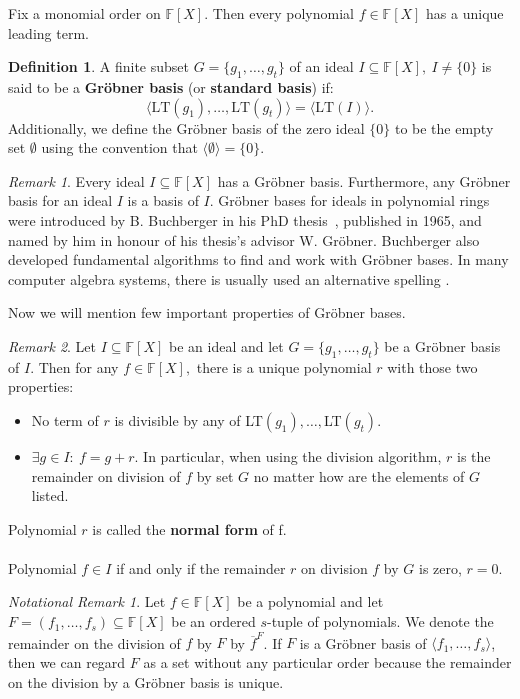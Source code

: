 \documentclass[thesis=M,english]{FITthesis}[2012/10/20]
\theoremstyle{remark}
\newtheorem*{RM}{Remark}
\newtheorem*{NRM}{Notational Remark}
\theoremstyle{definition}
\newtheorem{DF}{Definition}[section]
\begin{document}
\noindent Fix a monomial order on $\mathbb{F}[X]$. Then every polynomial $f \in \mathbb{F}[X]$ has a unique leading term.
\begin{DF} A finite subset $G = \{g_1, \ldots, g_t \}$ of an ideal $I \subseteq \mathbb{F}[X],\ I \neq \{ 0 \}$ is said to be a \textbf{Gröbner basis} (or \textbf{standard basis}) if:
$$
\langle \text{LT}(g_1), \ldots, \text{LT}(g_t) \rangle = \langle \text{LT}(I) \rangle.
$$
Additionally, we define the Gröbner basis of the zero ideal $\{0\}$ to be the empty set $\emptyset$ using the convention that $\langle \emptyset \rangle = \{0\}.$
\end{DF}
\begin{RM}
Every ideal $I \subseteq \mathbb{F}[X]$ has a Gröbner basis. Furthermore, any Gröbner basis for an ideal $I$ is a basis of $I$. Gröbner bases for ideals in polynomial rings were introduced by B. Buchberger in his PhD thesis~\cite{bruno}, published in 1965, and named by him in honour of his thesis's advisor W. Gröbner. Buchberger also developed fundamental algorithms to find and work with Gröbner bases. In many computer algebra systems, there is usually used an alternative spelling .
\end{RM}
\phantom{.}
\phantom{.}
\noindent Now we will mention few important properties of Gröbner bases.
\begin{RM}
Let $I \subseteq \mathbb{F}[X]$ be an ideal and let $G = \{g_1, \ldots, g_t\}$ be a Gröbner basis of $I$. Then for any $f \in \mathbb{F}[X],$ there is a unique polynomial $r$ with those two properties:
\begin{itemize}
\item No term of $r$ is divisible by any of LT$(g_1),\ldots,$LT$(g_t)$.
\item $\exists g \in I:\ f = g + r.$
In particular, when using the division algorithm, $r$ is the remainder on division of $f$ by set $G$ no matter how are the elements of $G$ listed.
\end{itemize}
Polynomial $r$ is called the \textbf{normal form} of f. \\ \\ 
\noindent Polynomial $f \in I$ if and only if the remainder $r$ on division $f$ by $G$ is zero, $r = 0.$
\end{RM}
\begin{NRM}
Let $f \in \mathbb{F}[X]$ be a polynomial and let $F = (f_1, \ldots, f_s) \subseteq \mathbb{F}[X]$ be an ordered $s$-tuple of polynomials. We denote the remainder on the division of $f$ by $F$ by $\overline{f}^F$. If $F$ is a Gröbner basis of $\langle f_1, \ldots, f_s \rangle$, then we can regard $F$ as a set without any particular order because the remainder on the division by a Gröbner basis is unique.
\end{NRM}
\end{document}
